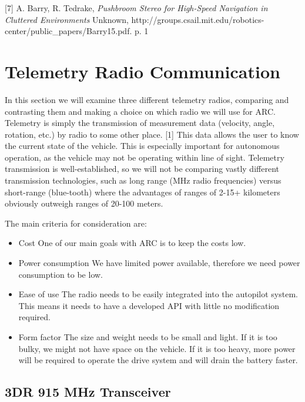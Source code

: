 \documentclass[compsoc,draftclsnofoot,onecolumn,10pt]{IEEEtran}
\begin{document}
[7] A. Barry, R. Tedrake, \textit{Pushbroom Stereo for High-Speed Navigation in
Cluttered Environments} Unknown,
http://groups.csail.mit.edu/robotics-center/public\_papers/Barry15.pdf. p. 1

\newpage

\section{Telemetry Radio Communication}
In this section we will examine three different telemetry radios, comparing and
contrasting them and making a choice on which radio we will use for ARC.
Telemetry is simply the transmission of measurement data (velocity, angle,
rotation, etc.) by radio to some other place. [1] This data allows the user to know the current state of the vehicle. This is especially
important for autonomous operation, as the vehicle may not be operating within
line of sight. Telemetry transmission is
well-established, so we will not be comparing vastly different transmission
technologies, such as long range (MHz radio frequencies) versus short-range
(blue-tooth) where the advantages of ranges of 2-15+ kilometers obviously
outweigh ranges of 20-100 meters.

The main criteria for consideration are:
\begin{itemize}

	\item Cost
		\subitem One of our main goals with ARC is to keep the costs low.
	\item Power consumption
		\subitem We have limited power available, therefore we need power
		consumption to be low.

	\item Ease of use
		\subitem The radio needs to be easily integrated into the autopilot
		system. This means it needs to have a developed API with little no
		modification required.

	\item Form factor
		\subitem The size and weight needs to be small and light. If it is too
		bulky, we might not have space on the vehicle. If it is too heavy, more
		power will be required to operate the drive system and will drain the
		battery faster.

\end{itemize}


\subsection{3DR 915 MHz Transceiver}
\end{document}
